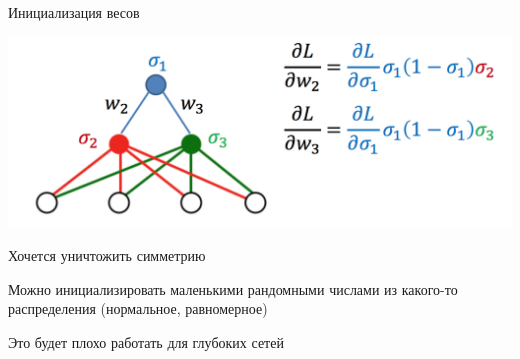 \documentclass[notes,12pt, aspectratio=169]{beamer}
\newenvironment{wideitemize}{\itemize\addtolength{\itemsep}{10pt}}{\enditemize}
\begin{document}
\begin{frame}{Инициализация весов}
	\begin{center}
		\includegraphics[width=.6\linewidth]{init1.png}
	\end{center}
	\begin{wideitemize}
		\item  Хочется уничтожить симметрию
		\item  Можно инициализировать маленькими рандомными числами из какого-то распределения (нормальное, равномерное)
		\item {\color{red}  Это будет плохо работать для глубоких сетей} 
	\end{wideitemize}
\end{frame}
\end{document}
